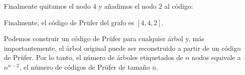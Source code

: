 Finalmente quitamos el nodo 4 y añadimos el nodo 2 al código:
\begin{center}
\end{center}

Finalmente, el código de Prüfer del grafo es $[4,4,2]$.

Podemos construir un código de Prüfer para cualquier árbol y, más
importantemente, el árbol original puede ser reconstruido a partir de un
código de Prüfer. Por lo tanto, el número de árboles etiquetados de $n$ nodos
equivale a $n^{n-2}$, el número de códigos de Prüfer de tamaño $n$.

